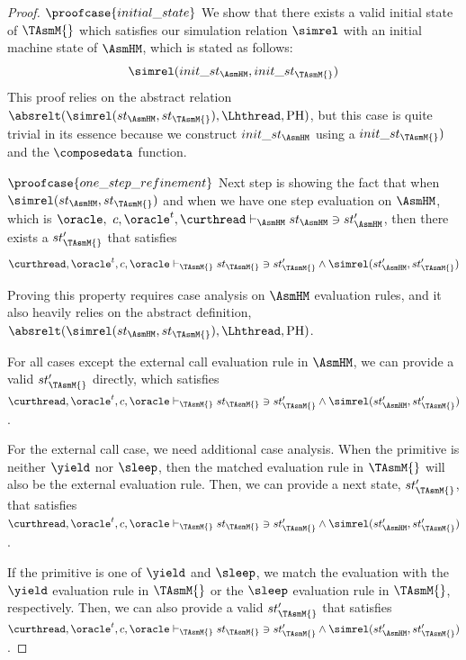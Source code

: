 \begin{proof} $\proofcase{initial\_state}$ We show that there exists a valid initial state of $\TAsmM{}$ which satisfies our simulation relation
$\simrel$ with an initial machine state of $\AsmHM$, which is stated as follows:
$$\simrel(init\_st_{\AsmHM}, init\_st_{\TAsmM{}})$$
This proof relies on the abstract relation $\absrelt(\simrel(st_{\AsmHM}, st_{\TAsmM{}}), \Lhthread, \mathrm{PH})$,
but this case is quite trivial in its essence
because we construct $init\_st_{\AsmHM}$ using a $init\_st_{\TAsmM{}})$ and 
the $\composedata$ function.

$\proofcase{one\_step\_refinement}$
Next step is showing the fact that when $\simrel(st_{\AsmHM}, st_{\TAsmM{}})$ and when we have one step evaluation on $\AsmHM$, which is $\oracle, \ c, \oracle^{t}, \curthread \vdash_{\AsmHM} st_{\AsmHM} \ni st'_{\AsmHM} $, 
then there exists a $st'_{\TAsmM{}}$ that satisfies 
$$\curthread, \oracle^{t}, c, \oracle \vdash_{\TAsmM{}} st_{\TAsmM{}} \ni st'_{\TAsmM{}} \wedge \simrel(st'_{\AsmHM}, st'_{\TAsmM{}})$$

Proving this property requires case analysis on $\AsmHM$ evaluation rules, and it  
also heavily relies on the abstract definition,  $\absrelt(\simrel(st_{\AsmHM}, st_{\TAsmM{}}), \Lhthread, \mathrm{PH})$.

For all cases except the external call evaluation rule in $\AsmHM$, 
we can provide a valid $st'_{\TAsmM{}}$ directly, which satisfies $\curthread, \oracle^{t}, c, \oracle \vdash_{\TAsmM{}} st_{\TAsmM{}} \ni st'_{\TAsmM{}} \wedge \simrel(st'_{\AsmHM}, st'_{\TAsmM{}})$.

For the external call case, we need additional case analysis.
When the primitive is neither $\yield$ nor $\sleep$, then the matched
evaluation rule in $\TAsmM{}$ will also be the external evaluation rule. 
Then, we can provide a next state, $st'_{\TAsmM{}}$, that satisfies $\curthread, \oracle^{t}, c, \oracle \vdash_{\TAsmM{}} st_{\TAsmM{}} \ni st'_{\TAsmM{}} \wedge \simrel(st'_{\AsmHM}, st'_{\TAsmM{}})$.

If the primitive is one of $\yield$ and $\sleep$, we match the evaluation with the $\yield$ evaluation rule in $\TAsmM{}$ or 
the $\sleep$ evaluation rule in $\TAsmM{}$, respectively.
Then, we can also provide a valid $st'_{\TAsmM{}}$ that satisfies $\curthread, \oracle^{t}, c, \oracle \vdash_{\TAsmM{}} st_{\TAsmM{}} \ni st'_{\TAsmM{}} \wedge \simrel(st'_{\AsmHM}, st'_{\TAsmM{}})$.
\end{proof}

